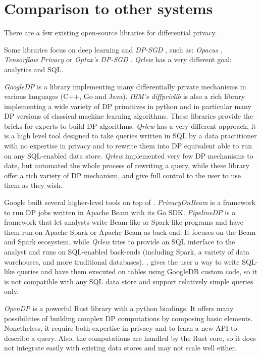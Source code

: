 \documentclass[letterpaper]{article} %
\newcommand{\qrlew}{\emph{Qrlew}}
\begin{document}
\section{Comparison to other systems}

There are a few existing open-source libraries for differential privacy.

Some libraries focus on deep learning and \emph{DP-SGD} \cite{abadi2016deep}, such as: \emph{Opacus} \cite{yousefpour2021opacus}, \emph{Tensorflow Privacy} \cite{TensorFlowPrivacy} or \emph{Optax's DP-SGD} \cite{deepmind2020jax}. \qrlew{} has a very different goal: analytics and SQL.

\emph{GoogleDP} \cite{GoogleDP} is a library implementing many differentially private mechanisms in various languages (C++, Go and Java).
\emph{IBM's diffprivlib} \cite{diffprivlib} is also a rich library implementing a wide variety of DP primitives in python and in particular many DP versions of classical machine learning algorithms. 
These libraries provide the bricks for experts to build DP algorithms. \qrlew{} has a very different approach, it is a high level tool designed to take queries written in SQL by a data practitioner with no expertise in privacy and to rewrite them into DP equivalent able to run on any SQL-enabled data store. \qrlew{} implemented very few DP mechanisms to date, but automated the whole process of rewriting a query, while these library offer a rich variety of DP mechanism, and give full control to the user to use them as they wish.

Google built several higher-level tools on top of \cite{GoogleDP}.
\emph{PrivacyOnBeam} \cite{PrivacyOnBeam} is a framework to run DP jobs written in Apache Beam with its Go SDK.
\emph{PipelineDP} \cite{PipelineDP} is a framework that let analysts write Beam-like or Spark-like programs and have them run on Apache Spark or Apache Beam as back-end. It focuses on the Beam and Spark ecosystem, while \qrlew{} tries to provide an SQL interface to the analyst and runs on SQL-enabled back-ends (including Spark, a variety of data warehouses, and more traditional databases).
\cite{ZetaSQL}, gives the user a way to write SQL-like queries and have them executed on tables using GoogleDB custom code, so it is not  compatible with any SQL data store and support relatively simple queries only.

\emph{OpenDP} \cite{OpenDP} is a powerful Rust library with a python bindings. It offers many possibilities of building complex DP computations by composing basic elements. Nonetheless, it require both expertise in privacy and to learn a new API to describe a query. Also, the computations are handled by the Rust core, so it does not integrate easily with existing data stores and may not scale well either.
\end{document}
